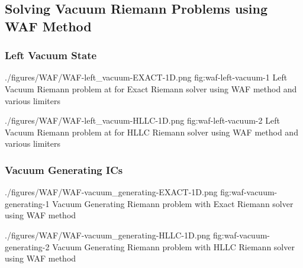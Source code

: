 \subsection{Solving Vacuum Riemann Problems using WAF Method}


\subsubsection{Left Vacuum State}



\quickfigcap
	{./figures/WAF/WAF-left_vacuum-EXACT-1D.png}
	{fig:waf-left-vacuum-1}
	{
		Left Vacuum Riemann problem at for Exact Riemann solver using WAF method and various limiters
	}
	
\quickfigcap
	{./figures/WAF/WAF-left_vacuum-HLLC-1D.png}
	{fig:waf-left-vacuum-2}
	{
		Left Vacuum Riemann problem at  for HLLC Riemann solver using WAF method and various limiters
	}








\subsubsection{Vacuum Generating ICs}



\quickfigcap
	{./figures/WAF/WAF-vacuum_generating-EXACT-1D.png}
	{fig:waf-vacuum-generating-1}
	{
		Vacuum Generating Riemann problem with Exact Riemann solver using WAF method
	}
	


\quickfigcap
	{./figures/WAF/WAF-vacuum_generating-HLLC-1D.png}
	{fig:waf-vacuum-generating-2}
	{
		Vacuum Generating Riemann problem with HLLC Riemann solver using WAF method
	}













